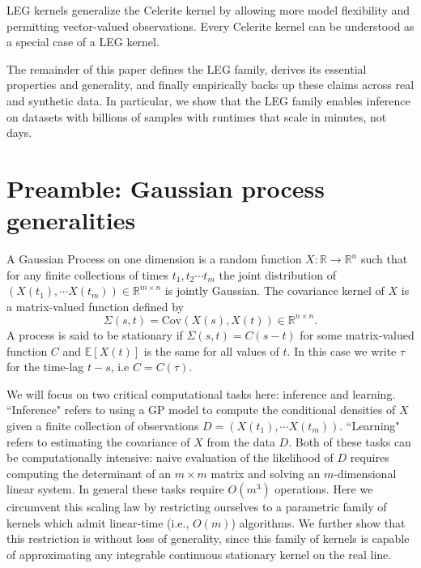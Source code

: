 \documentclass{article}
\theoremstyle{definition}
\newcommand{\reals}{\mathbb{R}}
\newcommand{\Cov}{\mathrm{Cov}}
\begin{document}
LEG kernels generalize the Celerite kernel \cite{foreman2017celerite} by allowing more model flexibility and permitting vector-valued observations.  Every Celerite kernel can be understood as a special case of a LEG kernel.   

The remainder of this paper defines the LEG family, derives its essential properties and generality, and finally empirically backs up these claims across real and synthetic data.  In particular, we show that the LEG family enables inference on datasets with billions of samples with runtimes that scale in minutes, not days.  


                           
\section{Preamble: Gaussian process generalities}

A Gaussian Process on one dimension is a random function $X: \reals \rightarrow \reals^n$ such that for any finite collections of times $t_1,t_2\cdots t_m$ the joint distribution of $(X(t_1),\cdots X(t_m)) \in \mathbb{R}^{m\times n}$ is jointly Gaussian.  The covariance kernel of $X$ is a matrix-valued function defined by 
\[
\Sigma(s,t) = \Cov(X(s),X(t)) \in \reals^{n\times n}.
\]
A process is said to be stationary if $\Sigma(s,t)=C(s-t)$ for some matrix-valued function $C$ and $\mathbb{E}[X(t)]$ is the same for all values of $t$.  In this case we write $\tau$ for the time-lag $t-s$, i.e $C=C(\tau)$.  

We will focus on two critical computational tasks here: inference and learning.  
``Inference" refers to using a GP model to compute the conditional densities of  $X$ given a finite collection of observations $D=(X(t_1),\cdots X(t_m))$.  ``Learning" refers to estimating the covariance of $X$ from the data $D$.  Both of these tasks can be computationally intensive: naive evaluation of the likelihood of $D$ requires computing the determinant of an $m\times m$ matrix and solving an $m$-dimensional linear system.
In general these tasks require $O(m^3)$ operations.  Here we circumvent this scaling law by restricting ourselves to a parametric family of kernels which admit linear-time (i.e., $O(m)$) algorithms.  We further show that this restriction is without loss of generality, since this family of kernels is capable of approximating any integrable continuous stationary kernel on the real line.
\end{document}
